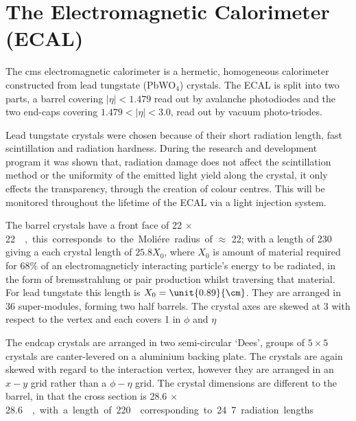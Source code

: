 
\section{The Electromagnetic Calorimeter (ECAL)} %
\label{sec:the_electromagnetic_calorimeter}
The \ac{cms} electromagnetic calorimeter\cite{ref:cmsecaltdr} is a hermetic,
homogeneous calorimeter constructed from lead tungstate (PbWO$_{4}$) crystals.
The ECAL is split into two parts, a barrel covering $|\eta| < 1.479$ read out
by avalanche photodiodes and the two end-caps covering $1.479 < |\eta| < 3.0$,
read out by vacuum photo-triodes.

Lead tungstate crystals were chosen because of their short radiation length,
fast scintillation and radiation hardness. During the research and development
program it was shown that, radiation damage does not affect the scintillation
method or the uniformity of the emitted light yield along the crystal, it only
effects the transparency, through the creation of colour centres. This will be
monitored throughout the lifetime of the ECAL via a light injection
system\cite{Smith:2000p5245}.

The barrel crystals have a front face of \unit{22 $\times$ 22}{\mm\squared},
this corresponds to the Moliére radius of $\approx $ \unit{22}{\mm}; with a
length of \unit{230}{\mm} giving a each crystal length of $25.8 X_{0}$, where
$X_{0}$ is amount of material required for 68$\%$ of an electromagneticly
interacting particle's energy to be radiated, in the form of bremsstrahlung or
pair production whilst traversing that material. For lead tungstate this length
is $X_{0}= \unit{0.89}{\cm}$. They are arranged in 36 super-modules, forming
two half barrels. The crystal axes are skewed at \unit{3}{\degree} with respect
to the vertex and each covers \unit{1}{\degree} in $\phi$ and $\eta$

The endcap crystals are arranged in two semi-circular `Dees', groups of
$5\times 5$ crystals are canter-levered on a aluminium backing plate. The
crystals are again skewed with regard to the interaction vertex, however they
are arranged in an $x-y$ grid rather than a $\phi - \eta$ grid. The crystal
dimensions are different to the barrel, in that the cross section is \unit{28.6
$\times$ 28.6}{\mm\squared}, with a length of \unit{220}{\mm} corresponding to
24.7 radiation lengths

